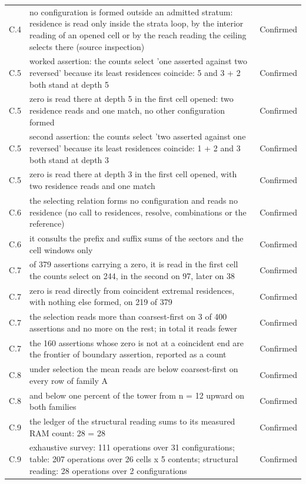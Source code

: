\documentclass[pdflatex,sn-mathphys-num]{sn-jnl}
\theoremstyle{thmstyleone}%
\theoremstyle{thmstyletwo}%
\theoremstyle{thmstylethree}%
\begin{document}
\begin{appendices}
\begin{longtable}{@{} p{} p{} p{} @{}}
C.4 & no configuration is formed outside an admitted stratum: residence is read only inside the strata loop, by the interior reading of an opened cell or by the reach reading the ceiling selects there (source inspection) & Confirmed \\
C.5 & worked assertion: the counts select 'one asserted against two reversed' because its least residences coincide: 5 and 3 + 2 both stand at depth 5 & Confirmed \\
C.5 & zero is read there at depth 5 in the first cell opened: two residence reads and one match, no other configuration formed & Confirmed \\
C.5 & second assertion: the counts select 'two asserted against one reversed' because its least residences coincide: 1 + 2 and 3 both stand at depth 3 & Confirmed \\
C.5 & zero is read there at depth 3 in the first cell opened, with two residence reads and one match & Confirmed \\
C.6 & the selecting relation forms no configuration and reads no residence (no call to residences, resolve, combinations or the reference) & Confirmed \\
C.6 & it consults the prefix and suffix sums of the sectors and the cell windows only & Confirmed \\
C.7 & of 379 assertions carrying a zero, it is read in the first cell the counts select on 244, in the second on 97, later on 38 & Confirmed \\
C.7 & zero is read directly from coincident extremal residences, with nothing else formed, on 219 of 379 & Confirmed \\
C.7 & the selection reads more than coarsest-first on 3 of 400 assertions and no more on the rest; in total it reads fewer & Confirmed \\
C.7 & the 160 assertions whose zero is not at a coincident end are the frontier of boundary assertion, reported as a count & Confirmed \\
C.8 & under selection the mean reads are below coarsest-first on every row of family A & Confirmed \\
C.8 & and below one percent of the tower from n = 12 upward on both families & Confirmed \\
C.9 & the ledger of the structural reading sums to its measured RAM count: 28 = 28 & Confirmed \\
C.9 & exhaustive survey: 111 operations over 31 configurations; table: 207 operations over 26 cells x 5 contents; structural reading: 28 operations over 2 configurations & Confirmed \\

\end{longtable}
\end{appendices}
\end{document}
